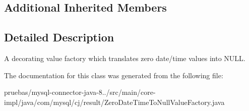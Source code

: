 \subsection*{Additional Inherited Members}


\subsection{Detailed Description}
A decorating value factory which translates zero date/time values into N\+U\+LL. 

The documentation for this class was generated from the following file\+:\begin{DoxyCompactItemize}
\item 
pruebas/mysql-\/connector-\/java-\/8../src/main/core-\/impl/java/com/mysql/cj/result/Zero\+Date\+Time\+To\+Null\+Value\+Factory.\+java\end{DoxyCompactItemize}
